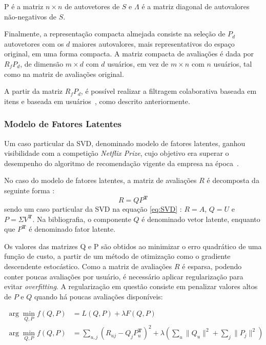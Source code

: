 P é a matriz $n \times n$ de autovetores de $S$ e $\Lambda$ é a matriz diagonal
de autovalores não-negativos de $S$.

Finalmente, a representação compacta almejada consiste na seleção de $P_d$ autovetores com os $d$
maiores autovalores, mais representativos do espaço original, em uma forma compacta.
A matriz compacta de avaliações é dada por $R_{f}P_{d}$, de dimensão $m \times
d$ com $d$ usuários, em vez de $m \times n$ com $n$ usuários, tal como na matriz
de avaliações original.

A partir da matriz $R_{f}P_{d}$, é possível realizar a filtragem colaborativa
baseada em itens e baseada em usuários~\cite{aggarwal2016recommender}, como descrito anteriormente.

\subsubsection{Modelo de Fatores Latentes}
Um caso particular da SVD, denominado modelo de fatores latentes, ganhou
visibilidade com a competição \textit{Netflix Prize}, cujo objetivo era superar
o desempenho do algoritmo de recomendação vigente da empresa na época~\cite{lessons_netflix_prize}.

No caso do modelo de fatores latentes, a matriz de avaliações $R$ é decomposta
da seguinte forma \cite{aggarwal2016recommender}:
\begin{equation}
    R = QP^{\mathbf{T}}
\end{equation}
sendo um caso particular da SVD na equação \ref{eq:SVD} : $R = A$, $Q = U$ e $P = \Sigma V^{\mathbf{T}}$.
Na bibliografia, o componente $Q$ é denominado vetor latente, enquanto que
$P^{\mathbf{T}}$ é denominado fator latente.

Os valores das matrizes Q e P são obtidos ao minimizar o erro quadrático de uma
função de custo, a partir de um método de otimização como o gradiente
descendente estocástico. Como a matriz de avaliações $R$ é esparsa,
podendo conter poucas avaliações por usuário, é necessário aplicar regularização
para evitar \textit{overfitting}. A regularização em questão consiste em
penalizar valores altos de $P$ e $Q$ quando há poucas avaliações disponíveis:

\begin{align}
    \arg\min_{Q,P} f(Q,P) &= L(Q,P) + \lambda F(Q,P) \\
    \arg\min_{Q,P} f(Q,P) &= \sum_{u,j} (R_{uj} - Q_j P_u^{\mathbf{T}})^2 + \lambda (\sum_u \|Q_u\|^2 + \sum_j \|P_j\|^2)
\end{align}


